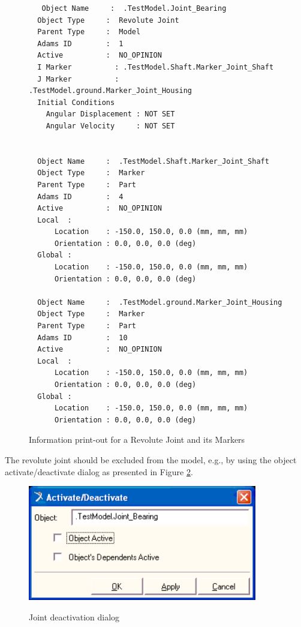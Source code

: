 \begin{figure}[h]
\small{
\begin{verbatim}
   Object Name     :  .TestModel.Joint_Bearing
  Object Type     :  Revolute Joint
  Parent Type     :  Model
  Adams ID        :  1
  Active          :  NO_OPINION
  I Marker          : .TestModel.Shaft.Marker_Joint_Shaft
  J Marker          : .TestModel.ground.Marker_Joint_Housing
  Initial Conditions
    Angular Displacement : NOT SET
    Angular Velocity     : NOT SET


  Object Name     :  .TestModel.Shaft.Marker_Joint_Shaft
  Object Type     :  Marker
  Parent Type     :  Part
  Adams ID        :  4
  Active          :  NO_OPINION
  Local  :
      Location    : -150.0, 150.0, 0.0 (mm, mm, mm)
      Orientation : 0.0, 0.0, 0.0 (deg)
  Global :
      Location    : -150.0, 150.0, 0.0 (mm, mm, mm)
      Orientation : 0.0, 0.0, 0.0 (deg)

  Object Name     :  .TestModel.ground.Marker_Joint_Housing
  Object Type     :  Marker
  Parent Type     :  Part
  Adams ID        :  10
  Active          :  NO_OPINION
  Local  :
      Location    : -150.0, 150.0, 0.0 (mm, mm, mm)
      Orientation : 0.0, 0.0, 0.0 (deg)
  Global :
      Location    : -150.0, 150.0, 0.0 (mm, mm, mm)
      Orientation : 0.0, 0.0, 0.0 (deg)
\end{verbatim}
}
\caption{Information print-out for a Revolute Joint and its Markers \label{figRevJnt}}
\end{figure}

The revolute joint should be excluded from the model, e.g., by using the object activate/deactivate dialog as presented in Figure \ref{figJointDeact}.
\begin{figure}[h]
\begin{center}
   {\includegraphics[width=10cm]{figs/JointDeact.png}}
\end{center}
\caption{Joint deactivation dialog \label{figJointDeact}}
\end{figure}


